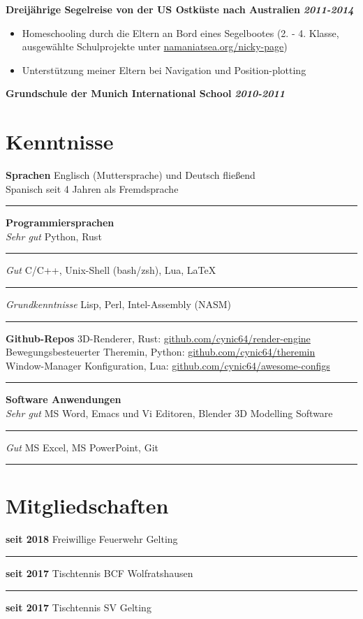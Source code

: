 \documentclass[12pt]{article}
\newcommand{\link}[1]{{\color{blue}\underline{#1}}}
\newcommand{\sect}[1]{
  {
    \vspace{12pt}
    \section*{
      \fontsize{18}{0}\selectfont
      \hspace{-12pt}
      \vspace{-12pt}
      #1
    }
    \vspace{-6pt}
  }
}
\newcommand{\sep}{{\color{gray}\vspace{-12pt}\hrule}}
\begin{document}
\textbf{Dreij{\"a}hrige Segelreise von der US Ostk{\"u}ste nach Australien} \hfill{\textit{\textbf{2011-2014}}}

\vspace{-18pt}
\begin{itemize}[leftmargin=*]
  \itemsep3pt

\item Homeschooling durch die Eltern an Bord eines Segelbootes (2. - 4. Klasse,
  ausgew{\"a}hlte Schulprojekte unter \link{namaniatsea.org/nicky-page})

\item Unterst{\"u}tzung meiner Eltern bei Navigation und Position-plotting

\end{itemize}
\vspace{-6pt}

\textbf{Grundschule der Munich International School} \hfill{\textit{\textbf{2010-2011}}}

\pagebreak

\sect{Kenntnisse}
\vspace{6pt}
\textbf{Sprachen} \hfill{Englisch (Muttersprache) und Deutsch flie{\ss}end} \\
\hspace*{\fill}Spanisch seit 4 Jahren als Fremdsprache \\
\sep
\vspace{12pt}

\textbf{Programmiersprachen} \\
\textit{Sehr gut} \hfill{Python, Rust} \\
\sep
\textit{Gut} \hfill{C/C++, Unix-Shell (bash/zsh), Lua, \LaTeX} \\
\sep
\textit{Grundkenntnisse} \hfill{Lisp, Perl, Intel-Assembly (NASM)} \\
\sep
\vspace{12pt}

{
  \small
  \textbf{Github-Repos} \hfill{3D-Renderer, Rust: \link{github.com/cynic64/render-engine}} \\
  \hspace*{\fill} Bewegungsbesteuerter Theremin, Python: \link{github.com/cynic64/theremin} \\
  \hspace*{\fill} Window-Manager Konfiguration, Lua:
  \link{github.com/cynic64/awesome-configs} \\
}
\sep
\vspace{12pt}

\textbf{Software Anwendungen} \\
\textit{Sehr gut} \hfill{MS Word, Emacs und Vi Editoren, Blender 3D Modelling Software} \\
\sep
\textit{Gut} \hfill{MS Excel, MS PowerPoint, Git} \\
\sep
\vspace{12pt}

\sect{Mitgliedschaften}

\vspace{6pt}
\textbf{seit 2018} \hfill{Freiwillige Feuerwehr Gelting} \\
\sep
\textbf{seit 2017} \hfill{Tischtennis BCF Wolfratshausen} \\
\sep
\textbf{seit 2017} \hfill{Tischtennis SV Gelting}
\end{document}
